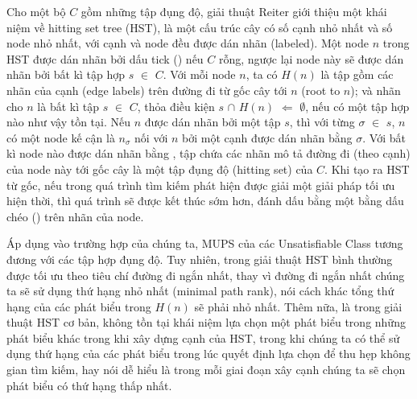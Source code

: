 		\hspace*{.05\textwidth} Cho một bộ $C$ gồm những tập đụng độ, giải thuật Reiter giới thiệu một khái niệm về hitting set tree (HST), là một cấu trúc cây có số cạnh nhỏ nhất và số node nhỏ nhất, với cạnh và node đều được dán nhãn (labeled). Một node $n$ trong HST được dán nhãn bởi dấu tick (\cmark) nếu $C$ rỗng, ngược lại node này sẽ được dán nhãn bởi bất kì tập hợp $s$ $\in$ $C$. Với mỗi node $n$, ta có $H(n)$ là tập gồm các nhãn của cạnh (edge labels) trên đường đi từ gốc cây tới $n$ (root to $n$); và nhãn cho $n$ là bất kì tập $s$ $\in$ $C$, thỏa điều kiện $s$ $\cap$ $H(n)$ $\Leftarrow$ $\emptyset$, nếu có một tập hợp nào như vậy tồn tại. Nếu $n$ được dán nhãn bởi một tập $s$, thì với từng $\sigma$ $\in$ $s$, $n$ có một node kế cận là $n_{\sigma}$ nối với $n$ bởi một cạnh được dán nhãn bằng $\sigma$. Với bất kì node nào được dán nhãn bằng \cmark , tập chứa các nhãn mô tả đường đi (theo cạnh) của node này tới gốc cây là một tập đụng độ (hitting set) của $C$. Khi tạo ra HST từ gốc, nếu trong quá trình tìm kiếm phát hiện được giải một giải pháp tối ưu hiện thời, thì quá trình sẽ được kết thúc sớm hơn, đánh dấu bằng một bằng dấu chéo (\xmark) trên nhãn của node.
		
		\hspace*{.05\textwidth} Áp dụng vào trường hợp của chúng ta, MUPS của các Unsatisfiable Class tương đương với các tập hợp đụng độ. Tuy nhiên, trong giải thuật HST bình thường được tối ưu theo tiêu chí đường đi ngắn nhất, thay vì đường đi ngắn nhất chúng ta sẽ sử dụng thứ hạng nhỏ nhất (minimal path rank), nói cách khác tổng thứ hạng của các phát biểu trong $H(n)$ sẽ phải nhỏ nhất. Thêm nữa, là trong giải thuật HST cơ bản, không tồn tại khái niệm lựa chọn một phát biểu trong những phát biểu khác trong khi xây dựng cạnh của HST, trong khi chúng ta có thể sử dụng thứ hạng của các phát biểu trong lúc quyết định lựa chọn để thu hẹp không gian tìm kiếm, hay nói dễ hiểu là trong mỗi giai đoạn xây cạnh chúng ta sẽ chọn phát biểu có thứ hạng thấp nhất.
		

